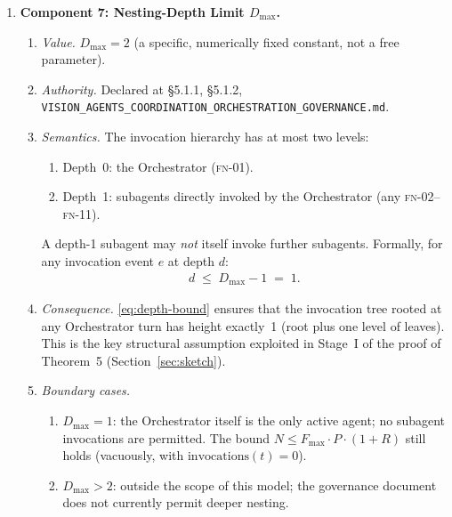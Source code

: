 \documentclass[12pt]{article}
\theoremstyle{definition}
\newcommand{\code}[1]{\texttt{#1}}
\newcommand{\FN}[1]{\textsc{fn-#1}}
\newcommand{\VisionGov}{\code{VISION\_AGENTS\_\allowbreak COORDINATION\_\allowbreak ORCHESTRATION\_\allowbreak GOVERNANCE.md}}
\begin{document}
\begin{enumerate}
  \item \textbf{Component 7: Nesting-Depth Limit $D_{\max}$.}
  \begin{enumerate}
    \item[7.1] \emph{Value.}
               $D_{\max} = 2$ (a specific, numerically fixed constant,
               not a free parameter).
    \item[7.2] \emph{Authority.}
               Declared at \S5.1.1, \S5.1.2,
               \VisionGov{}.
    \item[7.3] \emph{Semantics.}
               The invocation hierarchy has at most two levels:
               \begin{enumerate}
                 \item[(a)] Depth~0: the Orchestrator (\FN{01}).
                 \item[(b)] Depth~1: subagents directly invoked by the
                            Orchestrator (any \FN{02}--\FN{11}).
               \end{enumerate}
               A depth-1 subagent may \emph{not} itself invoke further
               subagents.  Formally, for any invocation event $e$ at
               depth $d$:
               \begin{align}
                 d \;\leq\; D_{\max} - 1 \;=\; 1.
                 \label{eq:depth-bound}
               \end{align}
    \item[7.4] \emph{Consequence.}
               \eqref{eq:depth-bound} ensures that the invocation tree
               rooted at any Orchestrator turn has height exactly~1
               (root plus one level of leaves).  This is the key
               structural assumption exploited in Stage~I of the proof
               of Theorem~5 (Section~\ref{sec:sketch}).
    \item[7.5] \emph{Boundary cases.}
               \begin{enumerate}
                 \item[(a)] $D_{\max} = 1$: the Orchestrator itself
                            is the only active agent; no subagent
                            invocations are permitted.  The bound
                            $N \leq F_{\max} \cdot P \cdot (1+R)$
                            still holds (vacuously, with
                            $\mathrm{invocations}(t) = 0$).
                 \item[(b)] $D_{\max} > 2$: outside the scope of this
                            model; the governance document does not
                            currently permit deeper nesting.
               \end{enumerate}
  \end{enumerate}
\end{enumerate}
\end{document}
